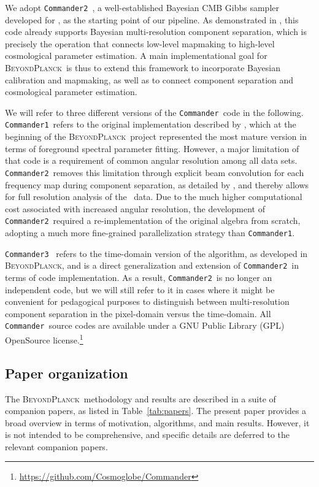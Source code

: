\documentclass[onecolumn]{aa}
\def\commander{\texttt{Commander}}
\def\commanderone{\texttt{Commander1}}
\def\commandertwo{\texttt{Commander2}}
\def\commanderthree{\texttt{Commander3}}
\newcommand{\BP}{\textsc{BeyondPlanck}}
\begin{document}
We adopt
\commandertwo\ \citep{eriksen:2004,eriksen2008,seljebotn:2019}, a
well-established Bayesian CMB Gibbs sampler developed for \Planck, as
the starting point of our pipeline. As demonstrated in
\citet{planck2016-l04}, this code already supports Bayesian
multi-resolution component separation, which is precisely the
operation that connects low-level mapmaking to high-level cosmological
parameter estimation. A main implementational goal for \BP\ is thus to
extend this framework to incorporate Bayesian calibration and
mapmaking, as well as to connect component separation and cosmological
parameter estimation.

We will refer to three different versions of the \commander\ code in
the following. \commanderone\ refers to the original implementation
described by \citet{eriksen:2004,eriksen2008}, which at the beginning
of the \BP\ project represented the most mature version in terms of
foreground spectral parameter fitting. However, a major limitation of
that code is a requirement of common angular resolution among all data
sets. \commandertwo\ removes this limitation through explicit beam
convolution for each frequency map during component separation, as
detailed by \citet{seljebotn:2019}, and thereby allows for full
resolution analysis of the \Planck\ data. Due to the much higher
computational cost associated with increased angular resolution, the
development of \commandertwo\ required a re-implementation of the
original algebra from scratch, adopting a much more fine-grained
parallelization strategy than \commanderone.

\commanderthree\ \citep{bp03} refers to the time-domain version of the
algorithm, as developed in \BP, and is a direct generalization and
extension of \commandertwo\ in terms of code implementation. As a
result, \commandertwo\ is no longer an independent code, but we will
still refer to it in cases where it might be convenient for
pedagogical purposes to distinguish between multi-resolution component
separation in the pixel-domain versus the time-domain. All
\commander\ source codes are available under a GNU Public Library
(GPL) OpenSource
license.\footnote{\url{https://github.com/Cosmoglobe/Commander}}

\subsection{Paper organization}
\label{sec:papers}

The \BP\ methodology and results are described in a suite of companion
papers, as listed in Table~\ref{tab:papers}. The present paper
provides a broad overview in terms of motivation, algorithms, and main
results. However, it is not intended to be comprehensive, and specific
details are deferred to the relevant companion papers.
\end{document}
